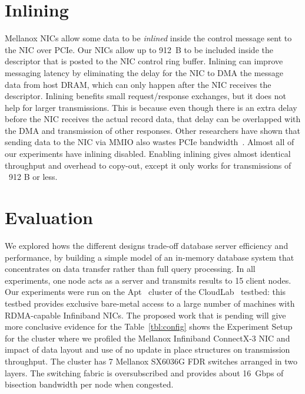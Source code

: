 \section{Inlining}
Mellanox NICs allow some data to be {\em inlined} inside the control message
sent to the NIC over PCIe. Our NICs allow up to 912~B to be included inside the
descriptor that is posted to the NIC control ring buffer.  Inlining can improve
messaging latency by eliminating the delay for the NIC to DMA the message data
from host DRAM, which can only happen after the NIC receives the descriptor.
Inlining benefits small request/response exchanges, but it does not help for
larger transmissions. This is because even though there is an extra delay
before the NIC receives the actual record data, that delay can be overlapped
with the DMA and transmission of other responses. Other researchers have shown
that sending data to the NIC via MMIO also wastes PCIe bandwidth~\cite{rdma}.
Almost all of our experiments have inlining disabled. Enabling inlining
gives almost identical throughput and overhead to copy-out, except it only
works for transmissions of ~912 B or less.


\section{Evaluation}





We explored hows the different designs trade-off database server efficiency and
performance, by building a simple model of an in-memory database system that
concentrates on data transfer rather than full query processing. In all experiments,
one node acts as a server and transmits results to 15 client nodes.
Our experiments were run on the Apt~\cite{Ricci+:OSR15} cluster of the
CloudLab~\cite{Cloudlab:URL} testbed: this testbed provides exclusive bare-metal
access to a large number of machines with RDMA-capable Infiniband NICs.
The proposed work that is pending will give more conclusive evidence for the 
Table~\ref{tbl:config} shows the Experiment Setup for the cluster where we profiled
the Mellanox Infiniband ConnectX-3 \textregistered NIC and impact of data layout and 
use of no update in place structures on transmission throughput. The cluster has 7
Mellanox SX6036G FDR switches arranged in two layers. The switching fabric is
oversubscribed and provides about 16~Gbps of bisection bandwidth per node
when congested.


